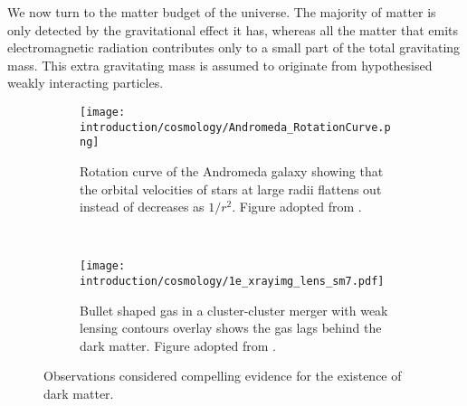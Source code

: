 \documentclass[MScProj_TLRH_ClusterEnergy.tex]{subfiles}
\begin{document}
We now turn to the matter budget of the universe. The majority of matter is
only detected by the gravitational effect it has, whereas all the matter
that emits electromagnetic radiation contributes only to a small part of the 
total gravitating mass. This extra gravitating mass is assumed to originate
from hypothesised weakly interacting particles. 
\newpage
\begin{figure}[ht]
  \centering
  \begin{subfigure}[b]{.5\textwidth}
    \centering
    \texttt{[image: introduction/cosmology/Andromeda\_RotationCurve.png]}
    \caption{Rotation curve of the Andromeda galaxy showing that the orbital 
             velocities of stars at large radii flattens out instead of decreases
             as $1/r^2$. Figure adopted from \citet{1970ApJ...159..379R}.}
    \label{fig:andromeda}
  \end{subfigure}%
  ~
  \begin{subfigure}[b]{.5\textwidth}
    \centering
    \texttt{[image: introduction/cosmology/1e\_xrayimg\_lens\_sm7.pdf]}
    \caption{Bullet shaped gas in a cluster-cluster merger with weak lensing 
             contours overlay shows the gas lags behind the dark matter.
             Figure adopted from \citet{2004ApJ...606..819M}.}
    \label{fig:bullet}
    \end{subfigure}
    \caption{Observations considered compelling evidence for the existence of 
             dark matter.}
    \label{fig:dmproof}
\end{figure}
\end{document}
